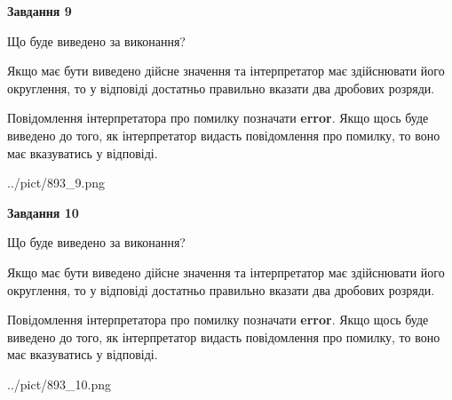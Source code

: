 \documentclass[12pt, ukrainian]{article}
\begin{document}
{\begin {Large}
{\begin {center}\textbf{Завдання 9}\end {center}}\par
Що буде виведено за виконання? \par

Якщо має бути виведено дійсне значення та інтерпретатор має здійснювати його округлення, 
то у відповіді достатньо правильно вказати два дробових розряди.

Повідомлення інтерпретатора про помилку позначати \textbf{error}.
Якщо щось буде виведено до того, як інтерпретатор видасть повідомлення про помилку, 
то воно має вказуватись у відповіді. \par

\begin{center}
	{../pict/893_9.png}
\end{center}
\newpage

{\begin {center}\textbf{Завдання 10}\end {center}}\par
Що буде виведено за виконання? \par

Якщо має бути виведено дійсне значення та інтерпретатор має здійснювати його округлення, 
то у відповіді достатньо правильно вказати два дробових розряди.

Повідомлення інтерпретатора про помилку позначати \textbf{error}.
Якщо щось буде виведено до того, як інтерпретатор видасть повідомлення про помилку, 
то воно має вказуватись у відповіді. \par

\begin{center}
	{../pict/893_10.png}
\end{center}
\newpage

\end {Large}}
\end{document}
